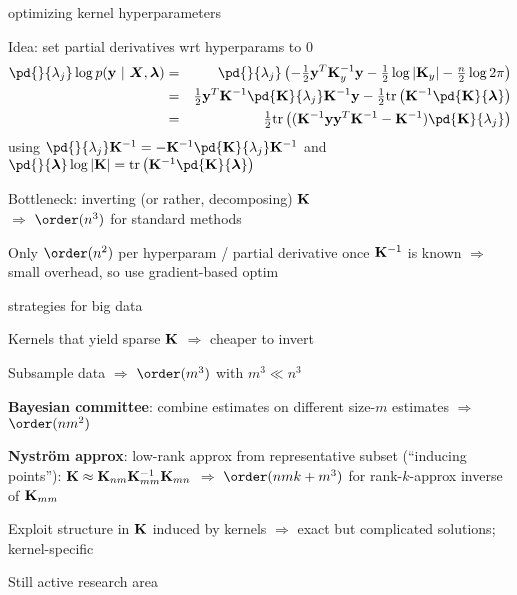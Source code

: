 \documentclass[11pt,compress,t,notes=noshow, xcolor=table]{beamer}
\begin{document}
\begin{framei}[sep=L]{optimizing kernel hyperparameters}
\item Idea: set partial derivatives wrt hyperparams to 0
\begin{eqnarray*}
\pd{}{\lambda_j}
\log p(\yv ~|~ \bm{X}, \lamv) &=& \pd{}{\lambda_j}  \left(-\tfrac{1}{2}\yv^T\Kmat_y^{-1} \yv - \tfrac{1}{2} \log \left| \Kmat_y \right| - \tfrac{n}{2} \log 2\pi\right) \\ 
&=&\tfrac{1}{2} \yv^T \Kmat^{-1} \pd{\Kmat}{\lambda_j}\Kmat^{-1} \yv - \tfrac{1}{2} \text{tr}\left(\Kmat^{-1} \pd{\Kmat}{ \lamv} \right) \\
&=& \tfrac{1}{2} \text{tr}\left((\Kmat^{-1}\yv\yv^T\Kmat^{-1} - \Kmat^{-1})\pd{\Kmat}{\lambda_j}\right)
\end{eqnarray*}
using $\pd{}{\lambda_j} \Kmat^{-1} = - \Kmat^{-1}  \pd{\Kmat}{\lambda_j}\Kmat^{-1}$ and $\pd{}{\lamv} \log  |\Kmat| = \text{tr}\left(\Kmat^{-1} \pd{\Kmat}{\lamv} \right)$
\item Bottleneck: inverting (or rather, decomposing) $\mathbf{K}$ \\$\Rightarrow$ $\order(n^3)$ for standard methods
\item Only $\order(n^2)$ per hyperparam / partial derivative once $\mathbf{K}^{-1}$ is known $\Rightarrow$ small overhead, so use gradient-based optim 
\end{framei}

\begin{framei}[sep=L]{strategies for big data}
\item Kernels that yield sparse $\mathbf{K}$ $\Rightarrow$ cheaper to invert
\item Subsample data $\Rightarrow$ $\order(m^3)$ with $m^3 \ll n^3$
\item \textbf{Bayesian committee}: combine estimates on different size-$m$ estimates $\Rightarrow$ $\order(nm^2)$
\item \textbf{Nyström approx}: low-rank approx from representative subset (``inducing points''): $\mathbf{K} \approx \mathbf{K}_{nm}\mathbf{K}_{mm}^{-1}\mathbf{K}_{mn}$ $\Rightarrow$ $\order(nmk + m^3)$ for rank-$k$-approx inverse of $\mathbf{K}_{mm}$
\item Exploit structure in $\mathbf{K}$ induced by kernels $\Rightarrow$ exact but complicated solutions; kernel-specific
\item Still active research area
\end{framei}

% 
% 
% 
% 
% 
% 

\endlecture
\end{document}
